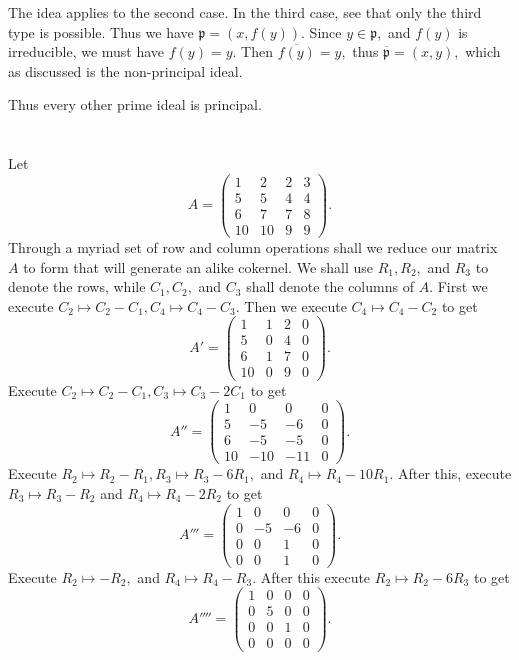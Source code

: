 \documentclass{article}
\begin{document}
The idea applies to the second case. In the third case, see that only the third type is possible. Thus we have $\mathfrak{p}=(x,f(y)).$ Since $y \in 
\mathfrak{p},$ and $f(y)$ is irreducible, we must have $f(y)=y.$ Then $\overline{f(y)}=y,$ thus $\overline{\mathfrak{p}}=(x,y),$ which as discussed is the 
non-principal ideal.

Thus every other prime ideal is principal.
\section{} %
Let $$A=\begin{pmatrix}
	1 & 2 & 2 &3 \\
	5 & 5 & 4 & 4\\
	6 & 7 & 7 & 8\\
	10 & 10 & 9 & 9
\end{pmatrix}.$$ Through a myriad set of row and column operations shall we reduce our matrix $A$ to form that will generate an alike cokernel. We shall use 
$R_1,R_2,$ and $R_3$ to denote the rows, while $C_1,C_2,$ and $C_3$ shall denote the columns of $A.$ First we execute $C_2 \mapsto C_2-C_1, C_4 \mapsto C_4 
- C_3.$ Then we execute $C_4 \mapsto C_4 - C_2$ to get $$A'=\begin{pmatrix}
1 & 1 & 2 & 0\\
5 & 0 & 4 & 0\\
6 & 1 & 7 & 0\\
10 & 0 & 9 & 0
\end{pmatrix}.$$
Execute $C_2 \mapsto C_2 - C_1, C_3 \mapsto C_3- 2 C_1$ to get $$A''=\begin{pmatrix}
	1 & 0 & 0 & 0\\
	5 & -5 & -6 & 0\\
	6 & -5 & -5 & 0\\
	10 & -10 & -11 &0
\end{pmatrix}. $$
Execute $R_2 \mapsto R_2 -R_1, R_3 \mapsto R_3- 6R_1,$ and $R_4 \mapsto R_4 - 10R_1.$ After this, execute $R_3 \mapsto R_3-R_2$ and $R_4 \mapsto R_4 - 2R_2$ 
to get $$A'''=\begin{pmatrix}
	1 & 0 & 0 & 0\\
	0 & -5 & -6 & 0\\
	0 & 0 & 1 & 0\\
	0 & 0 & 1 & 0
\end{pmatrix}.$$ Execute $R_2 \mapsto -R_2,$ and $R_4 \mapsto R_4 - R_3.$ After this execute $R_2 \mapsto R_2 - 6R_3$ to get $$A''''=\begin{pmatrix}
	1 & 0 & 0 & 0\\
0 & 5 & 0 & 0\\
0 & 0 & 1 & 0\\
0 & 0 & 0 & 0
\end{pmatrix}.$$
\end{document}

